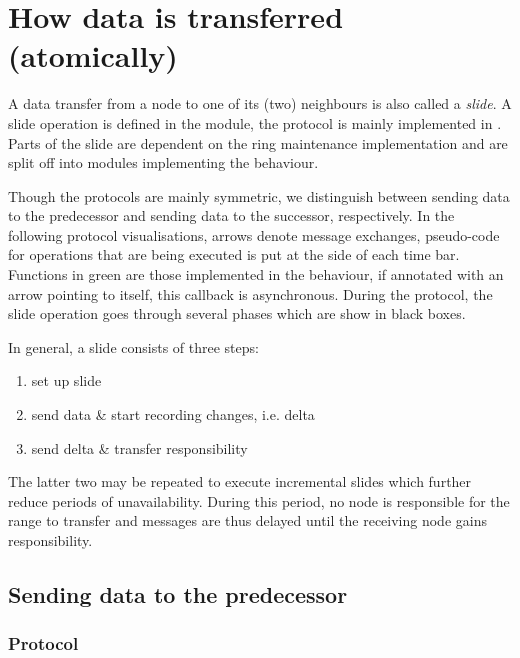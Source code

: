 \chapter{How data is transferred (atomically)}
\label{chapter.slide}

A data transfer from a node to one of its (two) neighbours is also called a
\emph{slide}. A slide operation is defined in the  module,
the protocol is mainly implemented in .
Parts of the slide are dependent on the ring maintenance implementation and are
split off into modules implementing the  behaviour.

Though the protocols are mainly symmetric, we distinguish between sending data
to the predecessor and sending data to the successor, respectively. In the
following protocol visualisations, arrows denote message exchanges, pseudo-code
for operations that are being executed is put at the side of each time bar.
Functions in green are those implemented in the 
behaviour, if annotated with an arrow pointing to itself, this callback is
asynchronous.
During the protocol, the slide operation goes through several phases which are
show in black boxes.

In general, a slide consists of three steps:
\begin{enumerate}
 \item set up slide
 \item send data \& start recording changes, i.e. delta
 \item send delta \& transfer responsibility
\end{enumerate}

The latter two may be repeated to execute incremental slides which further
reduce periods of unavailability. During this period, no node is responsible
for the range to transfer and messages are thus delayed until the receiving
node gains responsibility.

\section{Sending data to the predecessor}

\subsection{Protocol}


